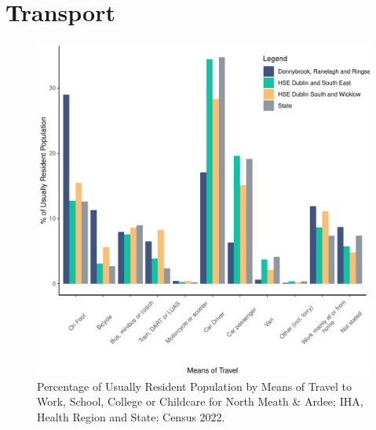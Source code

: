 \documentclass{article}
\begin{document}
\section{Transport}\label{sect:Trans}
\begin{figure}[H]
	\centering
	\includegraphics[width = 120mm]{../figures/TravelED.pdf}
	\caption{Percentage of Usually Resident Population by Means of Travel to Work, School, College or Childcare for North Meath & Ardee; IHA, Health Region and State; Census 2022.}
	\label{fig:vbnv}
	\end{figure}
\end{document}
